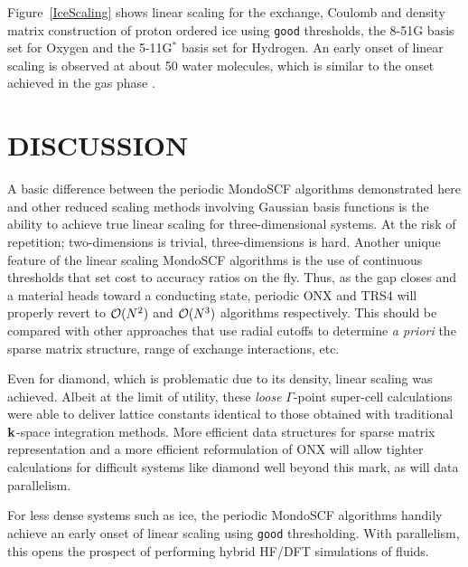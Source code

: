 \documentclass[prb,aps,nobibnotes,twocolumn,doublespace,twocolumngrid,superbib]{revtex4}
\begin{document}
Figure~\ref{IceScaling} shows linear scaling for the exchange, Coulomb and density matrix
construction of proton ordered ice \cite{} using {\tt good} thresholds, the 8-51G basis set
for Oxygen and the 5-11G$^*$ basis set for Hydrogen.  An early onset of linear scaling 
is observed at about 50 water molecules, which is similar to the onset achieved in the gas 
phase \cite{ANiklasson03}.


\section{DISCUSSION}

A basic difference between the periodic {\sc MondoSCF} algorithms demonstrated 
here and other reduced scaling methods involving Gaussian basis functions is the 
ability to achieve true linear scaling for three-dimensional systems.  At the risk
of repetition; two-dimensions is trivial, three-dimensions is hard.  Another unique
feature of the linear scaling {\sc MondoSCF} algorithms is the use of continuous
thresholds that set cost to accuracy ratios on the fly.  Thus, as the gap closes and
a material heads toward a conducting state, periodic {\sc ONX} and {\sc TRS4} will
properly revert to ${\cal O}(N^2)$ and ${\cal O}(N^3)$ algorithms respectively.  This
should be compared with other approaches that use radial cutoffs to determine {\em a priori} 
the sparse matrix structure, range of exchange interactions, etc. 

Even for diamond, which is problematic due to its density, linear scaling was achieved.  
Albeit at the limit of utility, these {\it loose} $\Gamma$-point super-cell calculations were 
able to deliver lattice constants identical to those obtained with traditional 
${\bf k}$-space integration methods.  More efficient data structures for sparse 
matrix representation and a more efficient reformulation of {\sc ONX} will allow 
tighter calculations for difficult systems like diamond well beyond this mark, 
as will data parallelism.  

For less dense systems such as ice, the periodic {\sc MondoSCF} algorithms handily 
achieve an early onset of linear scaling using {\tt good} thresholding.  With parallelism,
this opens the prospect of performing hybrid HF/DFT simulations of fluids. 
\end{document}
